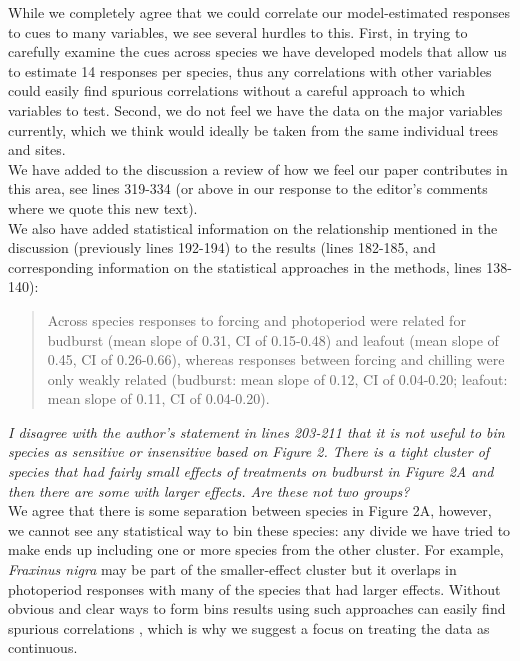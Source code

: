 \documentclass[11pt,a4paper]{article}
\begin{document}
While we completely agree that we could correlate our model-estimated responses to cues to many variables, we see several hurdles to this. First, in trying to carefully examine the cues across species we have developed models that allow us to estimate 14 responses per species, thus any correlations with other variables could easily find spurious correlations without a careful approach to which variables to test. Second, we do not feel we have the data on the major variables currently, which we think would ideally be taken from the same individual trees and sites. \\

We have added to the discussion a review of how we feel our paper contributes in this area, see lines 319-334 (or above in our response to the editor's comments where we quote this new text).\\

We also have added statistical information on the relationship mentioned in the discussion (previously lines 192-194) to the results (lines 182-185, and corresponding information on the statistical approaches in the methods, lines 138-140):
\begin{quote}
Across species responses to forcing and photoperiod were related for budburst (mean slope of 0.31, CI of 0.15-0.48) and leafout (mean slope of 0.45, CI of 0.26-0.66), whereas responses between forcing and chilling were only weakly related (budburst: mean slope of 0.12, CI of 0.04-0.20; leafout: mean slope of 0.11, CI of 0.04-0.20).
\end{quote}

\emph{I disagree with the author’s statement in lines 203-211 that it is not useful to bin species as sensitive or
insensitive based on Figure 2. There is a tight cluster of species that had fairly small
effects of treatments on budburst in Figure 2A and then there are some with larger effects.
Are these not two groups?} \\

We agree that there is some separation between species in Figure 2A, however, we cannot see any statistical way to bin these species: any divide we have tried to make ends up including one or more species from the other cluster. For example, \emph{Fraxinus nigra} may be part of the smaller-effect cluster but it overlaps in photoperiod responses with many of the species that had larger effects. Without obvious and clear ways to form bins results using such approaches can easily find spurious correlations \citep[e.g.,][]{gelmanbinning}, which is why we suggest a focus on treating the data as continuous. \\
\end{document}
